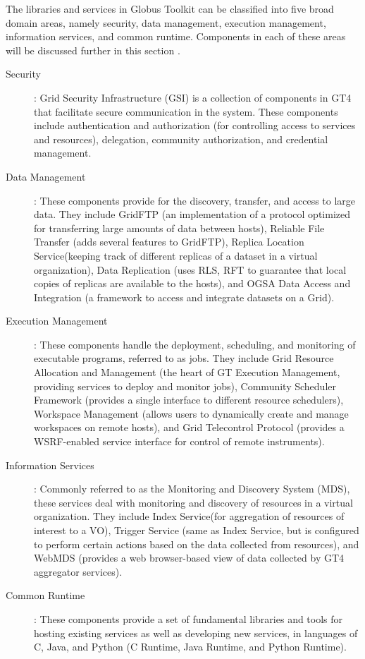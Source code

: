 \documentclass[9pt,twocolumn,twoside]{../../styles/osajnl}
\begin{document}
The libraries and services in Globus Toolkit can be classified into five broad domain areas, namely security, data management, execution management, information services, and common runtime. Components in each of these areas will be discussed further in this section \cite{sotomayor2006globus}.
\begin{description}

\item[Security]: Grid Security Infrastructure (GSI) is a collection of components in GT4 that facilitate secure communication in the system. These components include authentication and authorization (for controlling access to services and resources), delegation, community authorization, and credential management.

\item[Data Management]: These components provide for the discovery, transfer, and access to large data. They include GridFTP (an implementation of a protocol optimized for transferring large amounts of data between hosts), Reliable File Transfer (adds several features to GridFTP), Replica Location Service(keeping track of different replicas of a dataset in a virtual organization), Data Replication (uses RLS, RFT to guarantee that local copies of replicas are available to the hosts), and OGSA Data Access and Integration (a framework to access and integrate datasets on a Grid).

\item[Execution Management]: These components handle the deployment, scheduling, and monitoring of executable programs, referred to as jobs. They include Grid Resource Allocation and Management (the heart of GT Execution Management, providing services to deploy and monitor jobs), Community Scheduler Framework (provides a single interface to different resource schedulers), Workspace Management (allows users to dynamically create and manage workspaces on remote hosts), and Grid Telecontrol Protocol (provides a WSRF-enabled service interface for control of remote instruments).  

\item[Information Services]: Commonly referred to as the Monitoring and Discovery System (MDS), these services deal with monitoring and discovery of resources in a virtual organization. They include Index Service(for aggregation of resources of interest to a VO), Trigger Service (same as Index Service, but is configured to perform certain actions based on the data collected from resources), and WebMDS (provides a web browser-based view of data collected by GT4 aggregator services).

\item[Common Runtime]: These components provide a set of fundamental libraries and tools for hosting existing services as well as developing new services, in languages of C, Java, and Python (C Runtime, Java Runtime, and Python Runtime).

\end{description}
\end{document}
